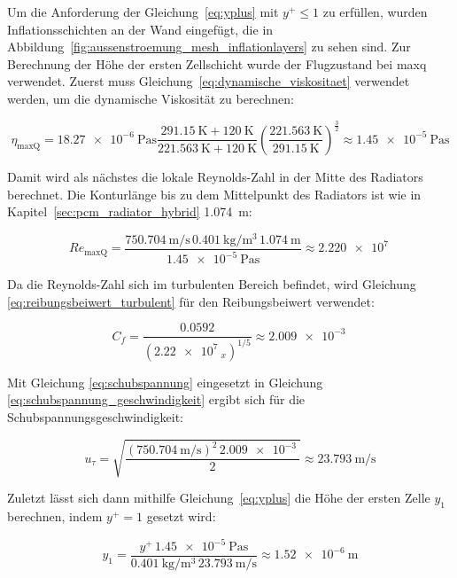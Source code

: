 Um die Anforderung der Gleichung~\ref{eq:yplus} mit $y^+ \leq 1$ zu erfüllen, wurden Inflationsschichten an der Wand eingefügt, die in Abbildung~\ref{fig:aussenstroemung_mesh_inflationlayers}
zu sehen sind. Zur Berechnung der Höhe der ersten Zellschicht wurde der Flugzustand bei \ac{maxq} verwendet.
Zuerst muss Gleichung~\ref{eq:dynamische_viskositaet} verwendet werden, um die dynamische Viskosität zu berechnen:

\begin{equation*}
  \eta_\mathrm{max Q} = \SI{18,27e-6}{\pascal\second} \frac{\SI{291,15}{\kelvin} + \SI{120}{\kelvin}}{\SI{221,563}{\kelvin} + \SI{120}{\kelvin}} {\left( \frac{\SI{221,563}{\kelvin}}{\SI{291,15}{\kelvin}} \right)}^{\frac{3}{2}} \approx \SI{1,45e-5}{\pascal\second}
\end{equation*}

Damit wird als nächstes die lokale Reynolds-Zahl in der Mitte des Radiators berechnet. Die Konturlänge bis zu dem Mittelpunkt des Radiators ist wie in Kapitel~\ref{sec:pcm_radiator_hybrid} \SI{1,074}{\meter}:

\begin{equation*}
  Re_{\mathrm{maxQ}} = \frac{\SI{750,704}{\meter\per\second}\,\SI{0,401}{\kilogram\per\meter\cubed}\,\SI{1,074}{\meter}}{\SI{1,45e-5}{\pascal\second}} \approx \SI{2,220e7}{}
\end{equation*}

Da die Reynolds-Zahl sich im turbulenten Bereich befindet, wird Gleichung \ref{eq:reibungsbeiwert_turbulent} für den Reibungsbeiwert verwendet:

\begin{equation*}
  C_f = \frac{0.0592}{\left({\SI{2,22e7}{}}_x\right)^{1/5}} \approx \SI{2,009e-3}{}
\end{equation*}

Mit Gleichung \ref{eq:schubspannung} eingesetzt in Gleichung \ref{eq:schubspannung_geschwindigkeit} ergibt sich für die Schubspannungsgeschwindigkeit:

\begin{equation*}
  u_{\tau} = \sqrt{\frac{\left(\SI{750,704}{\meter\per\second}\right)^2\,\SI{2,009e-3}{}}{2}} \approx \SI{23,793}{\meter\per\second}
\end{equation*}

Zuletzt lässt sich dann mithilfe Gleichung~\ref{eq:yplus} die Höhe der ersten Zelle $y_1$ berechnen, indem $y^+ = 1$ gesetzt wird:

\begin{equation*}
  y_1 = \frac{y^+\,\SI{1,45e-5}{\pascal\second}}{\SI{0,401}{\kilogram\per\meter\cubed}\,\SI{23,793}{\meter\per\second}} \approx \SI{1,52e-6}{\meter}
\end{equation*}

